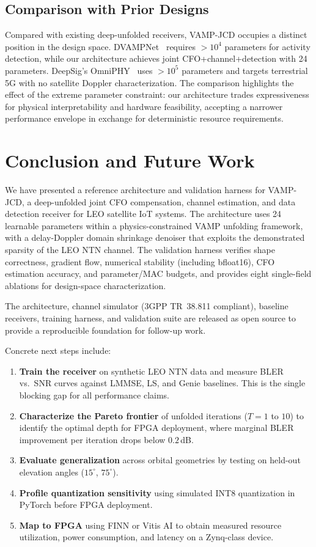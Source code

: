 \documentclass{article}
\begin{document}
\subsection{Comparison with Prior Designs}

Compared with existing deep-unfolded receivers, VAMP-JCD occupies a distinct position in the design space. DVAMPNet~\cite{hou2025dvampnet} requires $> 10^4$ parameters for activity detection, while our architecture achieves joint CFO+channel+detection with 24 parameters. DeepSig's OmniPHY~\cite{deepsig2024} uses $> 10^5$ parameters and targets terrestrial 5G with no satellite Doppler characterization. The comparison highlights the effect of the extreme parameter constraint: our architecture trades expressiveness for physical interpretability and hardware feasibility, accepting a narrower performance envelope in exchange for deterministic resource requirements.

\section{Conclusion and Future Work}
\label{sec:conclusion}

We have presented a reference architecture and validation harness for VAMP-JCD, a deep-unfolded joint CFO compensation, channel estimation, and data detection receiver for LEO satellite IoT systems. The architecture uses 24 learnable parameters within a physics-constrained VAMP unfolding framework, with a delay-Doppler domain shrinkage denoiser that exploits the demonstrated sparsity of the LEO NTN channel. The validation harness verifies shape correctness, gradient flow, numerical stability (including bfloat16), CFO estimation accuracy, and parameter/MAC budgets, and provides eight single-field ablations for design-space characterization.

The architecture, channel simulator (3GPP TR~38.811 compliant), baseline receivers, training harness, and validation suite are released as open source to provide a reproducible foundation for follow-up work.

Concrete next steps include:

\begin{enumerate}
  \item \textbf{Train the receiver} on synthetic LEO NTN data and measure BLER vs.\ SNR curves against LMMSE, LS, and Genie baselines. This is the single blocking gap for all performance claims.
  \item \textbf{Characterize the Pareto frontier} of unfolded iterations ($T = 1$ to $10$) to identify the optimal depth for FPGA deployment, where marginal BLER improvement per iteration drops below $0.2$\,dB.
  \item \textbf{Evaluate generalization} across orbital geometries by testing on held-out elevation angles ($15^\circ$, $75^\circ$).
  \item \textbf{Profile quantization sensitivity} using simulated INT8 quantization in PyTorch before FPGA deployment.
  \item \textbf{Map to FPGA} using FINN or Vitis AI to obtain measured resource utilization, power consumption, and latency on a Zynq-class device.
\end{enumerate}
\end{document}
